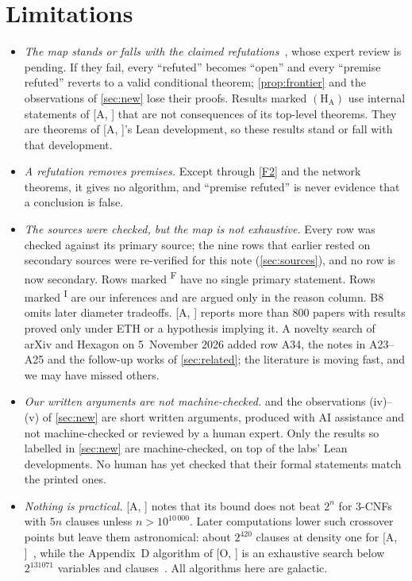 \documentclass[10pt]{amsart}
\theoremstyle{plain}
\theoremstyle{definition}
\theoremstyle{remark}
\numberwithin{equation}{section}
\newcommand{\A}[1][]{\textup{[A\if\relax\detokenize{#1}\relax\else, #1\fi]}}
\newcommand{\Oa}[1][]{\textup{[O\if\relax\detokenize{#1}\relax\else, #1\fi]}}
\newcommand{\HA}{\ensuremath{(\mathrm{H}_{\mathrm{A}})}}
\newcommand{\Inf}{\textsuperscript{I}}
\newcommand{\Fol}{\textsuperscript{F}}
\begin{document}
\section{Limitations}\label{sec:limitations}

\begin{itemize}
\item \emph{The map stands or falls with the claimed refutations}~\cite{Anthropic26,OpenAI26}, whose
expert review is pending. If they fail, every ``refuted'' becomes ``open'' and every ``premise
refuted'' reverts to a valid conditional theorem; \cref{prop:frontier} and the observations of
\cref{sec:new} lose their proofs. Results marked \HA{} use internal statements of \A{} that are not
consequences of its top-level theorems. They are theorems of \A's Lean development, so these
results stand or fall with that development.
\item \emph{A refutation removes premises.} Except through \ref{F2} and the network theorems, it gives
no algorithm, and ``premise refuted'' is never evidence that a conclusion is false.
\item \emph{The sources were checked, but the map is not exhaustive.} Every row was checked against
its primary source; the nine rows that earlier rested on secondary sources were re-verified for
this note (\cref{sec:sources}), and no row is now secondary. Rows marked \Fol{} have no single
primary statement. Rows marked \Inf{} are our inferences and are argued only in the reason column.
B8 omits later diameter tradeoffs. \A{} reports more than $800$ papers with results proved only
under ETH or a hypothesis implying it. A novelty search of arXiv and Hexagon on 5~November 2026 added
row A34, the notes in A23--A25 and the follow-up works of \cref{sec:related}; the literature is
moving fast, and we may have missed others.
\item \emph{Our written arguments are not machine-checked.}  and the
observations (iv)--(v) of \cref{sec:new} are short written arguments, produced with AI assistance
and not machine-checked or reviewed by a human expert. Only the results so labelled in
\cref{sec:new} are machine-checked, on top of the labs' Lean developments. No human has yet checked
that their formal statements match the printed ones.
\item \emph{Nothing is practical.} \A{} notes that its bound does not beat $2^n$ for $3$-CNFs with
$5n$ clauses unless $n>10^{10\,000}$. Later computations lower such crossover points but leave
them astronomical: about $2^{420}$ clauses at density one for \A~\cite{Maj26}, while the Appendix~D
algorithm of \Oa{} is an exhaustive search below $2^{131071}$ variables and clauses~\cite{Sze26}.
All algorithms here are galactic.
\end{itemize}
\end{document}
